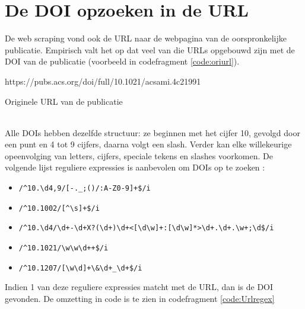 \section{De DOI opzoeken in de URL}
\label{Doiurl}
De web scraping vond ook de URL naar de webpagina van de oorspronkelijke publicatie. Empirisch valt het op dat veel van die URLs opgebouwd zijn met de DOI van de publicatie (voorbeeld in codefragment \ref{code:oriurl}).
\begin{listing}
    https://pubs.acs.org/doi/full/10.1021/acsami.4c21991
    \caption[Originele URL van de publicatie]{Originele URL van de publicatie}
    \label{code:oriurl}
\end{listing}\\
Alle DOIs hebben dezelfde structuur: ze beginnen met het cijfer 10, gevolgd door een punt en 4 tot 9 cijfers, daarna volgt een slash. Verder kan elke willekeurige opeenvolging van letters, cijfers, speciale tekens en slashes voorkomen.
De volgende lijst reguliere expressies is aanbevolen om DOIs op te zoeken \textcite{CrossrefRegex2025}:
\begin{itemize}
    \item \texttt{/\textasciicircum10.\textbackslash d{4,9}/[-.\_;()/:A-Z0-9]+\$/i}
    \item \texttt{/\textasciicircum10.1002/[\textasciicircum\textbackslash s]+\$/i}
    \item \texttt{/\textasciicircum10.\textbackslash d{4}/\textbackslash d+-\textbackslash d+X?(\textbackslash d+)\textbackslash d+<[\textbackslash d\textbackslash w]+:[\textbackslash d\textbackslash w]*>\textbackslash d+.\textbackslash d+.\textbackslash w+;\textbackslash d\$/i}
    \item \texttt{/\textasciicircum10.1021/\textbackslash w\textbackslash w\textbackslash d++\$/i}
    \item \texttt{/\textasciicircum10.1207/[\textbackslash w\textbackslash d]+\textbackslash \&\textbackslash d+\_\textbackslash d+\$/i}
\end{itemize}
Indien 1 van deze reguliere expressies matcht met de URL, dan is de DOI gevonden.
De omzetting in code is te zien in codefragment \ref{code:Urlregex}
